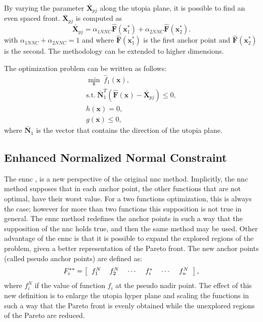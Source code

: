 By varying the parameter $\bar{\mathbf{X}}_{pj}$ along the utopia plane, it is possible to find an even spaced front. $\bar{\mathbf{X}}_{pj}$ is computed as%
%
\begin{equation}
\bar{\mathbf{X}}_{pj}= \alpha_{1NNC} \mathbf{\hat{F}}(\mathbf{x}_1^*)+\alpha_{2NNC} \mathbf{\hat{F}}(\mathbf{x}_2^*).
\label{eq:Xpj}
\end{equation}%
%
with $\alpha_{1NNC}+\alpha_{2NNC}=1$ and where $\mathbf{\hat{F}}(\mathbf{x}_1^*)$ is the first anchor point and $\mathbf{\hat{F}}(\mathbf{x}_2^*)$ is the second. The methodology can be extended to higher dimensions.

The optimization problem can be written as follows:
%
\begin{equation}
\begin{gathered}
\min_{\mathbf{x}}{\; \hat{f}_{1}(\mathbf{x})}, \\
\text{s.t.} \ \bar{\mathbf{N}}_1^T \left(\hat{\mathbf{F}}(\mathbf{x})-\bar{\mathbf{X}}_{pj}\right) \leq 0,\\
h(\mathbf{x})=0, \\
g(\mathbf{x}) \leq 0,
\end{gathered}
\label{eq:NNCProblem}
\end{equation}
%
where $\bar{\mathbf{N}}_1$ is the vector that contains the direction of the utopia plane.
\subsection{Enhanced Normalized Normal Constraint}
\label{sec:ENNC}
The \gls{ennc} \cite{Sanchis2008}, is a new perspective of the original \gls{nnc} method. Implicitly, the \gls{nnc} method supposes that in each anchor point, the other functions that are not optimal, have their worst value. For a two functions optimization, this is always the case; however for more than two functions this supposition is not true in general. The \gls{ennc} method redefines the anchor points in such a way that the supposition of the \gls{nnc} holds true, and then the same method may be used. Other advantage of the \gls{ennc} is that it is possible to expand the explored regions of the problem, given a better representation of the Pareto front.
%
The new anchor points (called pseudo anchor points) are defined as:
\begin{equation}
F_i^{**} = \left[
\begin{tabular}{cccccc}
$f_1^N$ & $f_2^N$ & $\cdots$ & $f_i^{*}$ & $\cdots$ & $f_n^N$
\end{tabular}
\right],
\label{eq:PseudoAnchor}
\end{equation}
%
where $f_i^N$ if the value of function $f_i$ at the pseudo nadir point. The effect of this new definition is to enlarge the utopia hyper plane and scaling the functions in such a way that the Pareto front is evenly obtained while the unexplored regions of the Pareto are reduced.

